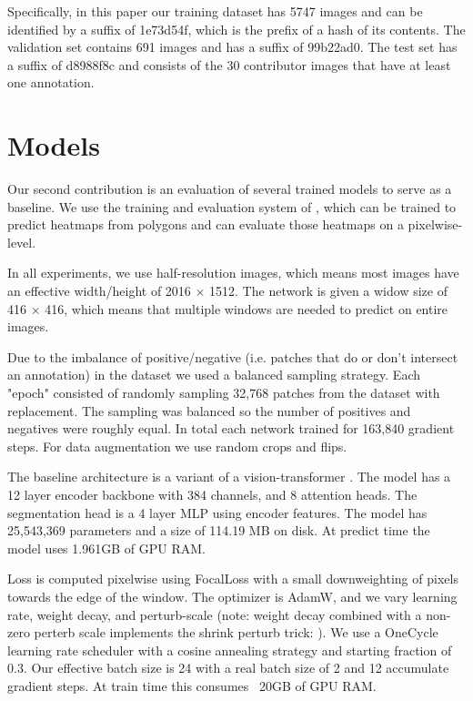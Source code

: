 \documentclass[10pt,twocolumn,letterpaper]{article}
\begin{document}
Specifically, in this paper our training dataset has 5747 images and can be
identified by a suffix of 1e73d54f, which is the prefix of a hash of its
contents.  The validation set contains 691 images and has a suffix of 99b22ad0.
The test set has a suffix of d8988f8c and consists of the 30 contributor images
that have at least one annotation.

\section{Models}

Our second contribution is an evaluation of several trained models to serve as
a baseline.  We use the training and evaluation system of
\cite{Greenwell_2024_WACV}, which can be trained to predict heatmaps from
polygons and can evaluate those heatmaps on a pixelwise-level.

In all experiments, we use half-resolution images, which means most images have
an effective width/height of 2016 $\times$ 1512. The network is given a widow
size of 416 $\times$ 416, which means that multiple windows are needed to
predict on entire images.  

Due to the imbalance of positive/negative (i.e. patches that do or don't
intersect an annotation) in the dataset we used a balanced sampling strategy.
Each "epoch" consisted of randomly sampling 32,768 patches from the dataset
with replacement.  The sampling was balanced so the number of positives and
negatives were roughly equal. In total each network trained for 163,840
gradient steps. For data augmentation we use random crops and flips.

The baseline architecture is a variant
\cite{bertasius2021space,Greenwell_2024_WACV} of a vision-transformer
\cite{dosovitskiy_image_2021}. The model has a 12 layer encoder backbone with
384 channels, and 8 attention heads. 
The segmentation head is a 4 layer MLP using encoder features.
The model has 25,543,369 parameters and a size of 114.19 MB on disk.
At predict time the model uses 1.961GB of GPU RAM.

Loss is computed pixelwise using FocalLoss \cite{ross2017focal} with a small
downweighting of pixels towards the edge of the window.  The optimizer is
AdamW, and we vary learning rate, weight decay, and perturb-scale (note: weight
decay combined with a non-zero perterb scale implements the shrink perturb
trick: \cite{ash_warm_starting_2020}).  We use a OneCycle learning rate
scheduler with a cosine annealing strategy and starting fraction of 0.3.  Our
effective batch size is 24 with a real batch size of 2 and 12 accumulate
gradient steps. At train time this consumes ~20GB of GPU RAM.
\end{document}
